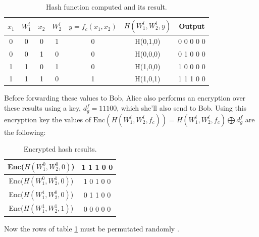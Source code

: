 \begin{refsection}
\begin{table}[H]
    \centering
    \begin{tabular}{|c|c|c|c|c|c|c|}
    \hline
    $x_1$       & $W_1^i$       & $x_2$         & $W_2^i$   &     $y=f_c(x_1, x_2)$     &    $H(W_1^i,W_2^i, y)$    &    Output                             \\ \hline
    0           & 0             & 0             & 1         &  0                        & H(0,1,0)                  & 0 0 0 0 0                             \\ \hline
    0           & 0             & 1             & 0         &  0                        & H(0,0,0)                  & 0 1 0 0 0                             \\ \hline
    1           & 1             & 0             & 1         &  0                        & H(1,0,0)                  & 1 0 0 0 0                             \\ \hline
    1           & 1             & 1             & 0         &  1                        & H(1,0,1)                  & 1 1 1 0 0                             \\ \hline

    \end{tabular}
    \caption{Hash function computed and its result.}
\end{table}

Before forwarding these values to Bob, Alice also performs an encryption over these results using a key, $d_g^f = 1 1 1 0 0$, which she'll also send to Bob. Using this encryption key the values of $\textrm{Enc}(H(W_1^i,W_2^i,f_c )) = H(W_1^i,W_2^i,f_c) \bigoplus d_g^f $ are the following:

\begin{table}[H]
    \centering
    \begin{tabular}{|c|c|}
    \hline
    Enc($H(W_1^0,W_2^0,0)$)             &    1 1 1 0 0                                      \\ \hline
    Enc($H(W_1^0,W_2^1,0)$)             &    1 0 1 0 0                                     \\ \hline
    Enc($H(W_1^1,W_2^0,0)$)             &    0 1 1 0 0                                     \\ \hline
    Enc($H(W_1^1,W_2^1,1)$)             &    0 0 0 0 0                                     \\ \hline
    \end{tabular}
    \caption{Encrypted hash results.} \label{tb:encryptedhash}
\end{table}
 Now the rows of table \ref{tb:encryptedhash} must be permutated randomly \cite{Yakoubov}. 


\end{refsection}
